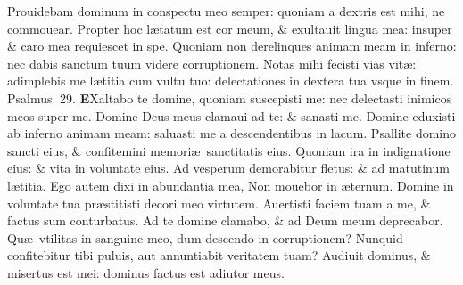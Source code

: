 \documentclass[a5paper,10pt]{book}
\def\ae{æ}
\begin{document}
\begin{multicols*}{2}
\newline \color{red} P\color{black}rouidebam dominum in conspectu meo semper: quoniam a dextris est mihi, ne commouear.
\newline \color{red} P\color{black}ropter hoc l\ae tatum est cor meum, \& exultauit lingua mea: insuper \& caro mea requiescet in spe.
\newline \color{red} Q\color{black}uoniam non derelinques animam meam in inferno: nec dabis sanctum tuum videre corruptionem.
\newline \color{red} N\color{black}otas mihi fecisti vias vit\ae : adimplebis me l\ae titia cum vultu tuo: delectationes in dextera tua vsque in finem.
\newline \color{red} Psalmus. \hypertarget{ps29}{29.} \color{black}
\vspace{-1em}
\lettrine[lines=2]{\bfseries \color{red} E}{}Xaltabo te domine, quoniam suscepisti me: nec delectasti inimicos meos super me.
\newline \color{red} D\color{black}omine Deus meus clamaui ad te: \& sanasti me.
\newline \color{red} D\color{black}omine eduxisti ab inferno animam meam: saluasti me a descendentibus in lacum.
\newline \color{red} P\color{black}sallite domino sancti eius, \& confitemini memori\ae \ sanctitatis eius.
\newline \color{red} Q\color{black}uoniam ira in indignatione eius: \& vita in voluntate eius.
\newline \color{red} A\color{black}d vesperum demorabitur fletus: \& ad matutinum l\ae titia.
\newline \color{red} E\color{black}go autem dixi in abundantia mea, Non mouebor in \ae ternum.
\newline \color{red} D\color{black}omine in voluntate tua pr\ae stitisti decori meo virtutem.
\newline \color{red} A\color{black}uertisti faciem tuam a me, \& factus sum conturbatus.
\newline \color{red} A\color{black}d te domine clamabo, \& ad Deum meum deprecabor.
\newline \color{red} Q\color{black}u\ae \ vtilitas in sanguine meo, dum descendo in corruptionem?
\newline \color{red} N\color{black}unquid confitebitur tibi puluis, aut annuntiabit veritatem tuam?
\newline \color{red} A\color{black}udiuit dominus, \& misertus est mei: dominus factus est adiutor meus.

\end{multicols*}
\end{document}
